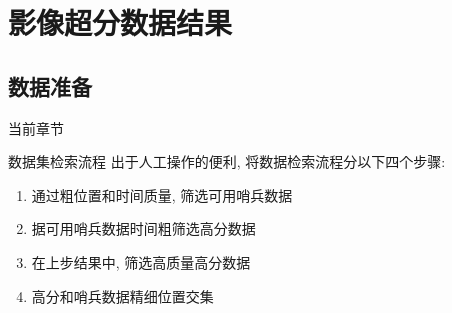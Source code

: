 \section{影像超分数据结果}

\subsection{数据准备}

\begin{frame}{当前章节}
\end{frame}

\begin{frame}{数据集检索流程}
    出于人工操作的便利, 将数据检索流程分以下四个步骤:
    \begin{enumerate}
        \item 通过粗位置和时间质量, 筛选可用哨兵数据
        \item 据可用哨兵数据时间粗筛选高分数据
        \item 在上步结果中, 筛选高质量高分数据
        \item 高分和哨兵数据精细位置交集
    \end{enumerate}
\end{frame}

